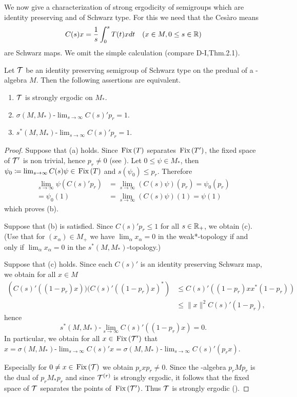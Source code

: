 We now give a characterization of strong ergodicity of semigroups which are identity preserving and of Schwarz type.
For this we need that the Cesàro means
\[
C(s)x = \frac{1}{s}\int_{0}^{s} T(t)xdt \quad (x \in M, 0 \leq s \in \mathbb{R})
\]
are Schwarz maps.
We omit the simple calculation (compare D-I,Thm.2.1).
\begin{proposition}\label{prop:d4-3.3}
Let $\mathcal{T}$ be an identity preserving semigroup of Schwarz type on the predual of a \WA-algebra $M$.
Then the following assertions are equivalent.
\begin{enumerate}[\upshape (a)]
\item
$\mathcal{T}$ is strongly ergodic on $M_{*}$.

\item
$\sigma(M,M_{*})\text{-}\lim_{s \to \infty} C(s)'p_{r} = 1$.

\item
$s^{*}(M,M_{*})\text{-}\lim_{s \to \infty} C(s)'p_{r} = 1$.
\end{enumerate}
\end{proposition}
\begin{proof}
Suppose that (a) holds.
Since $\mathop{}\mathrm{Fix}\left(T\right)$ separates $\mathop{}\mathrm{Fix}\left(T'\right)$, the fixed space of $\mathcal{T}'$ is non trivial, hence $p_{r} \neq 0$ (see \citet[Chap.2, Thm.1.4]{krengel:1985}).
Let $0 \leq \psi \in M_{*}$, then $\psi_{0} \coloneqq \lim_{s \to \infty} C(s)\psi \in \mathop{}\mathrm{Fix}\left(T\right)$ and $s(\psi_{0}) \leq p_{r}$.
Therefore
\begin{align*}
\lim_{s \to \infty} \psi(C(s)'p_{r}) &= \lim_{s \to \infty} (C(s)\psi)(p_{r})  = \psi_{0}(p_{r})  \\
= \psi_{0}(1) &= \lim_{s \to \infty} (C(s)\psi)(1) = \psi(1)
\end{align*}
which proves (b).

Suppose that (b) is satisfied.
Since $C(s)'p_{r} \leq 1$ for all $s \in \mathbb{R}_{+}$, we obtain (c).
(Use that for $(x_{\alpha}) \in M_{+}$ we have $\lim_{\alpha}x_{\alpha} = 0$ in the weak*-topology if and only if $\lim_{\alpha}x_{\alpha} = 0$ in the $s^{*}(M,M_{*})$-topology.)

Suppose that (c) holds.
Since each $C(s)'$ is an identity preserving Schwarz map, we obtain for all $x \in M$
\begin{align*}
	\left( C(s)'((1-p_{r})x))(C(s)'((1-p_{r})x)^{*} \right) 
			&\leq C(s)'((1-p_{r})xx^{*}(1-p_{r}))  \\
 	&\leq \|x\|^2 C(s)'(1-p_{r}),
\end{align*}
hence
\[
s^{*}(M,M_{*})\text{-}\lim_{s \to \infty} C(s)'((1-p_{r})x) = 0.
\]
In particular, we obtain for all $x \in \mathop{}\mathrm{Fix}\left(\mathcal{T}'\right)$ that $x = \sigma(M,M_{*})\text{-}\lim_{s \to \infty} C(s)'x = \sigma(M,M_{*})\text{-}\lim_{s \to \infty} C(s)'(p_{r}x)$.

Especially for $0 \neq x \in \mathop{}\mathrm{Fix}\left(\mathcal{T}\right)$ we obtain $p_{r}xp_{r} \neq 0$.
Since the \WA-algebra $p_{r}Mp_{r}$ is the dual of $p_{r}M_{*}p_{r}$ and since $\mathcal{T}^{(r)}$ is strongly ergodic, it follows that the fixed space of\/ $\mathcal{T}$ separates the points of $\mathop{}\mathrm{Fix}\left(\mathcal{T}'\right)$.
Thus $\mathcal{T}$ is strongly ergodic (\citet[Chap. 2, Thm. 1.4]{krengel:1985}).
\end{proof}
